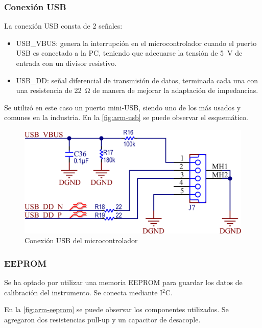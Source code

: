 \documentclass[../et.tex]{subfiles}
\begin{document}
\subsubsection{Conexión USB}
La conexión USB consta de 2 señales:

\begin{itemize}
  \item USB\_VBUS: genera la interrupción en el microcontrolador cuando el puerto USB es conectado a la PC, teniendo que adecuarse la tensión de \SI{5}{V} de entrada con un divisor resistivo.
  \item USB\_DD: señal diferencial de transmisión de datos, terminada cada una con una resistencia de \SI{22}{\ohm} de manera de mejorar la adaptación de impedancias.
\end{itemize}

Se utilizó en este caso un puerto mini-USB, siendo uno de los más usados y comunes en la industria. En la \autoref{fig:arm-usb} se puede observar el esquemático.

\begin{figure}[!htbp]
  \centering
  \includegraphics[scale=1.5]{../images/arm-usb.png}
  \caption{Conexión USB del microcontrolador}
  \label{fig:arm-usb}
\end{figure}

\subsubsection{EEPROM}
Se ha optado por utilizar una memoria EEPROM para guardar los datos de calibración del instrumento. Se conecta mediante I$^2$C.

En la \autoref{fig:arm-eeprom} se puede observar los componentes utilizados. Se agregaron dos resistencias pull-up y un capacitor de desacople.
\end{document}
